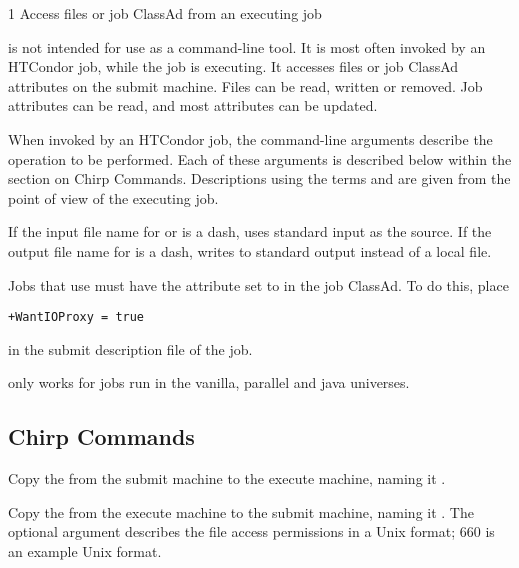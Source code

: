 \begin{ManPage}{\label{man-condor-chirp}}{1}
{Access files or job ClassAd from an executing job}
\Synopsis
{}

\Description 
{}
 is not intended for use as a command-line tool.
It is most often invoked by an HTCondor job, while the job is executing.
It accesses files or job ClassAd attributes on the submit machine.
Files can be read, written or removed.
Job attributes can be read, and most attributes can be updated.

When invoked by an HTCondor job,
the command-line arguments describe the operation to be performed. 
Each of these arguments is described below within the section
on Chirp Commands.
Descriptions using the terms  and 
are given from the point of view of the executing job.

If the input file name for  or  is a dash,
 uses standard input as the source.
If the output file name for  is a dash,
 writes to standard output instead of a local file.

Jobs that use  must have the attribute
 set to  in the job ClassAd.
To do this, place
\begin{verbatim}
+WantIOProxy = true
\end{verbatim}
in the submit description file of the job.

 only works for jobs run in the
vanilla, parallel and java universes.

\subsection*{Chirp Commands}
\begin{description}

    {Copy the  from the submit machine
    to the execute machine, naming it .}
    {Copy the  from the execute machine
    to the submit machine, naming it .
    The optional  argument describes the file access
    permissions in a Unix format; 660 is an example Unix format.

}
\end{description}
\end{ManPage}
